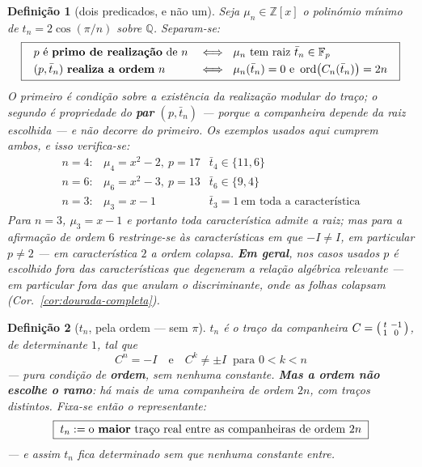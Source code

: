 \documentclass[11pt,a4paper]{article}
\newtheorem{definicao}{Definição}
\begin{document}
\begin{definicao}[dois predicados, e não um]\label{def:primo-ordem}
Seja $\mu_n\in\mathbb{Z}[x]$ o polinómio mínimo de $t_n=2\cos(\pi/n)$ sobre
$\mathbb{Q}$. Separam-se:
\[
\boxed{\;
\begin{array}{ll}
p\ \text{é \textbf{primo de realização} de } n
 & \iff\ \mu_n\ \text{tem raiz } \bar t_n\in\mathbb{F}_p\\[3pt]
(p,\bar t_n)\ \text{\textbf{realiza a ordem} } n
 & \iff\ \mu_n(\bar t_n)=0\ \text{e}\ \operatorname{ord}\bigl(C_n(\bar t_n)\bigr)=2n
\end{array}\;}
\]
O primeiro é condição sobre a \emph{existência} da realização modular do traço; o
segundo é propriedade do \textbf{par} $(p,\bar t_n)$ --- porque a companheira depende
da raiz escolhida --- e não decorre do primeiro. Os exemplos usados aqui cumprem ambos, e isso verifica-se:
\[
\begin{array}{lll}
n=4: & \mu_4=x^{2}-2,\ p=17 & \bar t_4\in\{11,6\}\\
n=6: & \mu_6=x^{2}-3,\ p=13 & \bar t_6\in\{9,4\}\\
n=3: & \mu_3=x-1 & \bar t_3=1\ \text{em toda a característica}
\end{array}
\]
Para $n=3$, $\mu_3=x-1$ e portanto \emph{toda} característica admite a raiz; mas
para a afirmação de ordem $6$ restringe-se às características em que $-I\neq I$,
em particular $p\neq2$ --- em característica $2$ a ordem colapsa. \textbf{Em geral},
nos casos usados $p$ é escolhido \emph{fora das características que degeneram a
relação algébrica relevante} --- em particular fora das que anulam o discriminante,
onde as folhas colapsam (Cor.~\ref{cor:dourada-completa}).
\end{definicao}

\begin{definicao}[$t_n$, pela ordem --- sem $\pi$]\label{def:tn}
$t_n$ é o traço da companheira
$C=\begin{psmallmatrix}t&-1\\1&0\end{psmallmatrix}$, de determinante $1$, tal que
\[
\boxed{\;C^{n}=-I\quad\text{e}\quad C^{k}\neq\pm I\ \text{ para } 0<k<n\;}
\]
--- pura condição de \textbf{ordem}, sem nenhuma constante. \textbf{Mas a ordem
não escolhe o ramo}: há mais de uma companheira de ordem $2n$, com traços
distintos. Fixa-se então o representante:
\[
\boxed{\;t_n:=\text{o \textbf{maior} traço real entre as companheiras de ordem }2n\;}
\]
--- e assim $t_n$ fica determinado sem que nenhuma constante entre.
\end{definicao}
\end{document}
